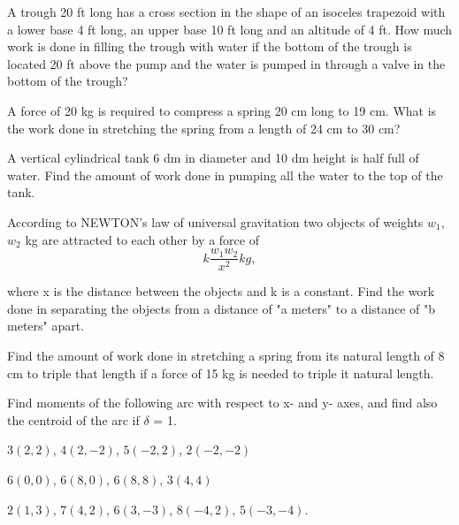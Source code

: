 \documentclass[11pt]{amsbook}
\begin{document}
    \begin{hEnumerateArabic}
        \setcounter{enumi}{42}
    
        \item A trough 20 ft long has a cross section in the shape of an isoceles trapezoid with a lower base 4 ft long, an upper base 10 ft long and an altitude of 4 ft. How much work is done in filling the trough with water if the bottom of the trough is located 20 ft above the pump and the water is pumped in through a valve in the bottom of the trough?
     
        \item A force of 20 kg is required to compress a spring 20 cm long to 19 cm. What is the work done in stretching the spring from a length of 24 cm to 30 cm?
        
        \item A vertical cylindrical tank 6 dm in diameter and 10 dm height is half full of water. Find the amount of work done in pumping all the water to the top of the tank.
        
        \item According to NEWTON's law of universal gravitation two objects of weights $w_{1}$, $w_{2} $ kg are attracted to each other by a force of
              $$k \frac{w_{1}w_{2}}{x^2}  kg,$$

        \noindent where x is the distance between the objects and k is a
        constant. Find the work done in separating the objects from a distance of "a meters" to a distance of "b meters" apart.
        
        \item Find the amount of work done in stretching a spring from its natural length of 8 cm to triple that length if a force of 15 kg is needed to triple it natural length.
        
        \item Find moments of the following arc with respect to x- and y- axes, and find also the centroid of the arc if $\delta$ = 1. 
    
    \end{hEnumerateArabic}

	\begin{hEnumerateAlpha}
		\item $3(2, 2)$, $4(2, -2)$, $5(-2, 2)$, $2(-2, -2)$

		\item $6(0, 0)$, $6(8, 0)$, $6(8, 8)$, $3(4, 4)$

		\item $2(1, 3)$, $7(4, 2)$, $6(3, -3)$, $8(-4, 2)$, $5(-3, -4)$.
		
 
	\end{hEnumerateAlpha}	
    
\end{document}

